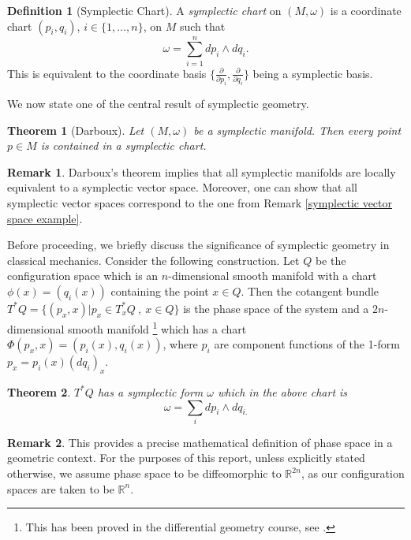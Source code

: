 \documentclass[12pt,oneside]{report}
\newtheorem{theorem}{Theorem}[section]  %
\theoremstyle{definition}
\newtheorem{definition}{Definition}
\newtheorem{remark}{Remark}
\begin{document}
\begin{definition}[Symplectic Chart]
A \emph{symplectic chart} on $(M,\omega)$ is a coordinate chart $(p_i,q_i)$, $i \in \{1,\dots,n\}$, on $M$ such that
$$
\omega = \sum_{i=1}^{n} dp_i \wedge dq_i.
$$
This is equivalent to the coordinate basis $\{\frac{\partial}{\partial p_i},\frac{\partial}{\partial q_i}\}$ being a symplectic basis.
\end{definition}
\noindent We now state one of the central result of symplectic geometry.

\begin{theorem}[Darboux]
Let $(M,\omega)$ be a symplectic manifold. Then every point $p\in M$ is contained in a symplectic chart.
\end{theorem}

\begin{remark}
 Darboux’s theorem implies that all symplectic manifolds are locally equivalent to a symplectic vector space. Moreover, one can show that all symplectic vector spaces correspond to the one from Remark \ref{symplectic vector space example}.
 \end{remark}
Before proceeding, we briefly discuss the significance of symplectic geometry in classical mechanics. Consider the following construction. Let $Q$ be the configuration space which is an $n$-dimensional smooth manifold with a chart $\phi(x) = (q_{i}(x))$ containing the point $x \in Q$. Then the cotangent bundle $T^{*}Q = \{(p_{x},x)| p_{x} \in T^{*}_{x}Q \ ,\ x \in Q \}$ is the phase space of the system and a $2n$-dimensional smooth manifold \footnote{This has been proved in the differential geometry course, see \cite{DifferentialGeometry}.} which has a chart $\Phi(p_{x},x) = (p_{i}(x),q_{i}(x))$, where $p_{i}$ are component functions of the 1-form $p_{x} = p_{i}(x)(dq_{i})_{x}$. 
\begin{theorem}
    $T^{*}Q$ has a symplectic form $\omega$ which in the above chart is
    $$ \omega = \sum_{i}dp_{i} \wedge dq_{i.}$$
\end{theorem}

\begin{remark}
   This provides a precise mathematical definition of phase space in a geometric context. For the purposes of this report, unless explicitly stated otherwise, we assume phase space to be diffeomorphic to \( \mathbb{R}^{2n} \), as our configuration spaces are taken to be \( \mathbb{R}^{n} \).
\end{remark}
\end{document}
